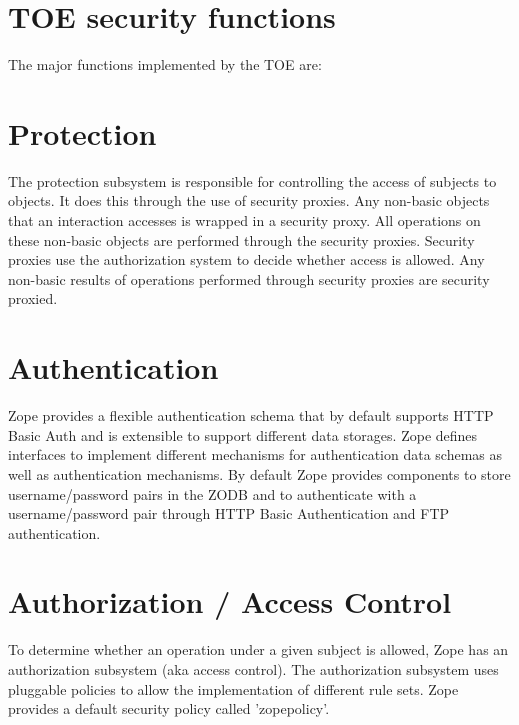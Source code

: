 \documentclass[12pt,english]{scrbook}
\begin{document}
\section{TOE security functions}

The major functions implemented by the TOE are:





\section{Protection}

The protection subsystem is responsible for controlling the access of subjects
to objects.  It does this through the use of security proxies.  Any non-basic
objects that an interaction accesses is wrapped in a security proxy.  All
operations on these non-basic objects are performed through the security
proxies. Security proxies use the authorization system to decide whether access
is allowed.  Any non-basic results of operations performed through security
proxies are security proxied.





\section{Authentication}

Zope provides a flexible authentication schema that by default supports HTTP
Basic Auth and is extensible to support different data
storages. Zope defines interfaces to implement different mechanisms for
authentication data schemas as well as authentication mechanisms. By default
Zope provides components to store username/password pairs in the ZODB and to
authenticate with a username/password pair through HTTP Basic Authentication
and FTP authentication.





\section{Authorization / Access Control}

To determine whether an operation under a given subject is allowed, Zope has an
authorization subsystem (aka access control). The authorization subsystem uses
pluggable policies to allow the implementation of different rule sets. Zope
provides a default security policy called 'zopepolicy'.
\end{document}
